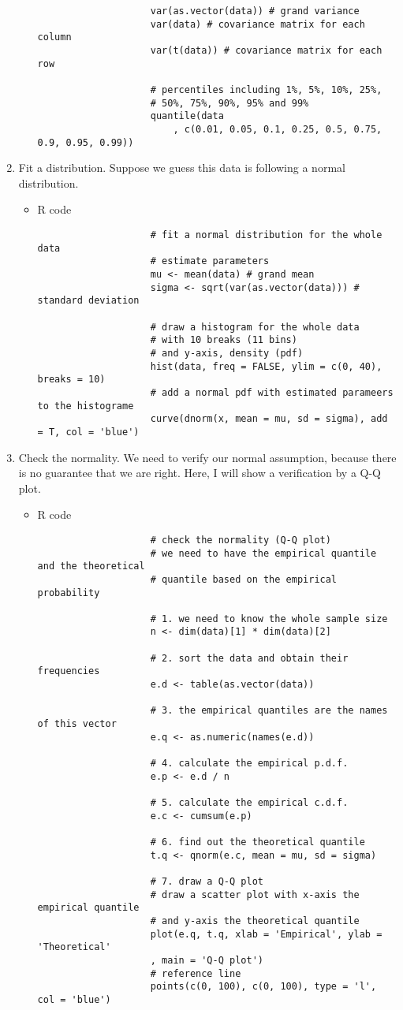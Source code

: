 \begin{enumerate}
\begin{itemize}
\begin{verbatim}
					var(as.vector(data)) # grand variance
					var(data) # covariance matrix for each column
					var(t(data)) # covariance matrix for each row
					
					# percentiles including 1%, 5%, 10%, 25%, 
					# 50%, 75%, 90%, 95% and 99%
					quantile(data 
						, c(0.01, 0.05, 0.1, 0.25, 0.5, 0.75, 0.9, 0.95, 0.99)) 
				\end{verbatim}
		\end{itemize}
	\item Fit a distribution. Suppose we guess this data is following a normal distribution.
		\begin{itemize}
			\item R code
				\begin{verbatim}
					# fit a normal distribution for the whole data 
					# estimate parameters
					mu <- mean(data) # grand mean
					sigma <- sqrt(var(as.vector(data))) # standard deviation
					
					# draw a histogram for the whole data 
					# with 10 breaks (11 bins) 
					# and y-axis, density (pdf)
					hist(data, freq = FALSE, ylim = c(0, 40), breaks = 10)
					# add a normal pdf with estimated parameers to the histograme
					curve(dnorm(x, mean = mu, sd = sigma), add = T, col = 'blue')
				\end{verbatim}
		\end{itemize}
	\item Check the normality. We need to verify our normal assumption, because there is no guarantee that we are right. Here, I will show a verification by a Q-Q plot.
		\begin{itemize}
			\item R code
				\begin{verbatim}
					# check the normality (Q-Q plot)
					# we need to have the empirical quantile and the theoretical 
					# quantile based on the empirical probability
					
					# 1. we need to know the whole sample size
					n <- dim(data)[1] * dim(data)[2]
					
					# 2. sort the data and obtain their frequencies
					e.d <- table(as.vector(data))
					
					# 3. the empirical quantiles are the names of this vector
					e.q <- as.numeric(names(e.d))
					
					# 4. calculate the empirical p.d.f.
					e.p <- e.d / n
					
					# 5. calculate the empirical c.d.f.
					e.c <- cumsum(e.p)
					
					# 6. find out the theoretical quantile
					t.q <- qnorm(e.c, mean = mu, sd = sigma)
					
					# 7. draw a Q-Q plot
					# draw a scatter plot with x-axis the empirical quantile 
					# and y-axis the theoretical quantile
					plot(e.q, t.q, xlab = 'Empirical', ylab = 'Theoretical'
					, main = 'Q-Q plot')
					# reference line
					points(c(0, 100), c(0, 100), type = 'l', col = 'blue') 
				\end{verbatim}
		\end{itemize}
\end{enumerate}